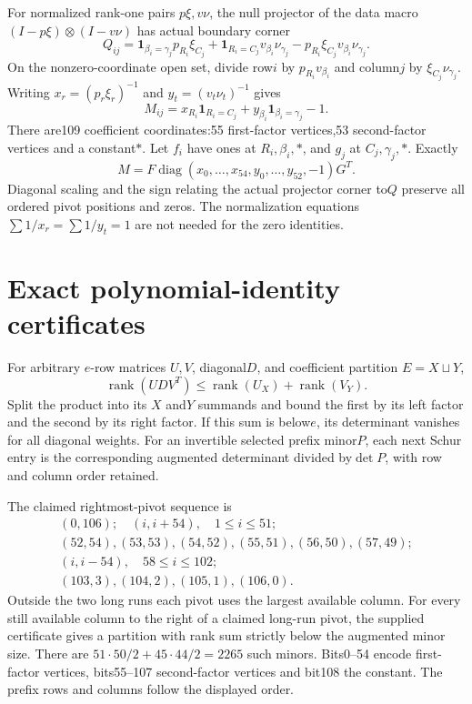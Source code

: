 \documentclass[11pt]{article}
\begin{document}
For normalized rank-one pairs $p\xi,v\nu$, the null projector of the data macro $(I-p\xi)\otimes(I-v\nu)$ has actual boundary corner
\[
Q_{ij}=\mathbf1_{\beta_i=\gamma_j}p_{R_i}\xi_{C_j}
+\mathbf1_{R_i=C_j}v_{\beta_i}\nu_{\gamma_j}
-p_{R_i}\xi_{C_j}v_{\beta_i}\nu_{\gamma_j}.
\]
On the nonzero-coordinate open set, divide row$i$ by $p_{R_i}v_{\beta_i}$ and column$j$ by $\xi_{C_j}\nu_{\gamma_j}$. Writing $x_r=(p_r\xi_r)^{-1}$ and $y_t=(v_t\nu_t)^{-1}$ gives
\[
M_{ij}=x_{R_i}\mathbf1_{R_i=C_j}+y_{\beta_i}\mathbf1_{\beta_i=\gamma_j}-1.
\]
There are109 coefficient coordinates:55 first-factor vertices,53 second-factor vertices and a constant$*$. Let $f_i$ have ones at $R_i,\beta_i,*$, and $g_j$ at $C_j,\gamma_j,*$. Exactly
\[
M=F\operatorname{diag}(x_0,\ldots,x_{54},y_0,\ldots,y_{52},-1)G^T.
\]
Diagonal scaling and the sign relating the actual projector corner to$Q$ preserve all ordered pivot positions and zeros. The normalization equations $\sum1/x_r=\sum1/y_t=1$ are not needed for the zero identities.

\section{Exact polynomial-identity certificates}
For arbitrary $e$-row matrices $U,V$, diagonal$D$, and coefficient partition $E=X\sqcup Y$,
\[
\operatorname{rank}(UDV^T)\leq\operatorname{rank}(U_X)+\operatorname{rank}(V_Y).
\]
Split the product into its $X$ and$Y$ summands and bound the first by its left factor and the second by its right factor. If this sum is below$e$, its determinant vanishes for all diagonal weights. For an invertible selected prefix minor$P$, each next Schur entry is the corresponding augmented determinant divided by$\det P$, with row and column order retained.

The claimed rightmost-pivot sequence is
\[
\begin{gathered}
(0,106);\quad(i,i+54),\quad1\leq i\leq51;\\
(52,54),(53,53),(54,52),(55,51),(56,50),(57,49);\\
(i,i-54),\quad58\leq i\leq102;\\
(103,3),(104,2),(105,1),(106,0).
\end{gathered}
\]
Outside the two long runs each pivot uses the largest available column. For every still available column to the right of a claimed long-run pivot, the supplied certificate gives a partition with rank sum strictly below the augmented minor size. There are $51\cdot50/2+45\cdot44/2=2265$ such minors. Bits0--54 encode first-factor vertices, bits55--107 second-factor vertices and bit108 the constant. The prefix rows and columns follow the displayed order.
\end{document}

